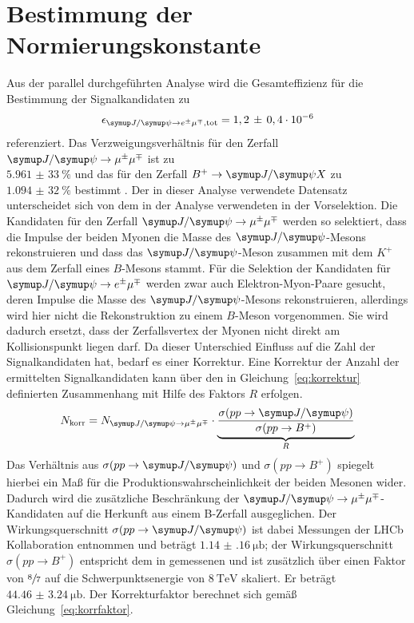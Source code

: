 \section{Bestimmung der Normierungskonstante}
\label{sec:norm}
Aus der parallel durchgeführten Analyse \cite{ba-maik} wird die Gesamteffizienz für die Bestimmung der Signalkandidaten zu
%
\begin{equation}
  \epsilon_{\signal, \text{tot}}=1,2\,\pm\,0,4\cdot 10^{-6}
\end{equation}
%
referenziert. Das Verzweigungsverhältnis für den Zerfall $\kontroll$ ist zu \\$\SI{5,961(33)}{\percent}$ und das für den Zerfall $B^{+}\rightarrow\jpsi X$ zu $\SI{1,094(32)}{\percent}$ bestimmt \cite{pdg}. Der in
dieser Analyse verwendete Datensatz unterscheidet sich von dem in der Analyse \cite{ba-maik} verwendeten in der Vorselektion. Die
Kandidaten für den Zerfall $\kontroll$ werden so selektiert, dass die Impulse der beiden Myonen die Masse des $\jpsi$-Mesons
rekonstruieren und dass das $\jpsi$-Meson zusammen mit dem $K^+$ aus dem Zerfall eines $B$-Mesons stammt. Für die Selektion der Kandidaten für $\signal$ werden zwar auch Elektron-Myon-Paare gesucht, deren Impulse die Masse des $\jpsi$-Mesons rekonstruieren, allerdings wird
hier nicht die Rekonstruktion zu einem $B$-Meson vorgenommen. Sie wird dadurch ersetzt, dass der Zerfallsvertex der Myonen nicht direkt
am Kollisionspunkt liegen darf. Da dieser Unterschied Einfluss auf die Zahl der Signalkandidaten hat, bedarf es einer Korrektur. Eine Korrektur der Anzahl der ermittelten Signalkandidaten kann über den in Gleichung~\eqref{eq:korrektur} definierten Zusammenhang mit Hilfe des Faktors $R$ erfolgen.
%
\begin{equation}
  N_\text{korr}=N_{\kontroll}\cdot\underbrace{\frac{\sigma(pp\rightarrow\jpsi)}{\sigma(pp\rightarrow B^+)}}_{R}
  \label{eq:korrektur}
\end{equation}
%
Das Verhältnis aus $\sigma(pp\rightarrow\jpsi)$ und $\sigma(pp\rightarrow B^+)$ spiegelt hierbei ein Maß für die
Produktionswahrscheinlichkeit der beiden Mesonen wider. Dadurch wird die zusätzliche Beschränkung der $\kontroll$-Kandidaten auf die Herkunft aus einem B-Zerfall ausgeglichen. Der Wirkungsquerschnitt $\sigma(pp\rightarrow\jpsi)$ ist dabei Messungen der LHCb Kollaboration entnommen \cite{sigmajpsi} und beträgt $\SI{1.14(16)}{\micro\barn}$; der Wirkungsquerschnitt $\sigma(pp\rightarrow B^+)$ entspricht dem in \cite{sigmaB} gemessenen und ist zusätzlich über einen Faktor von $\sfrac{8}{7}$ auf die Schwerpunktsenergie von $\SI{8}{\tera\electronvolt}$ skaliert. Er beträgt $\SI{44.46(324)}{\micro\barn}$. Der Korrekturfaktor berechnet sich gemäß Gleichung~\eqref{eq:korrfaktor}.
